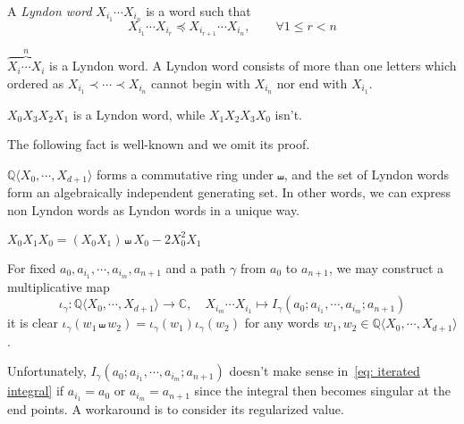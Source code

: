 \begin{definition}
A \textit{Lyndon word} $X_{i_1}\cdots X_{i_n}$ is a word such that
\begin{equation}\label{eq: Lyndon word}
X_{i_1}\cdots X_{i_r}\preceq X_{i_{r+1}}\cdots X_{i_n},\qquad\forall 1\leq r<n
\end{equation}
\end{definition}

\begin{remark}
$\overbrace{X_i\cdots X_i}^{n}$ is a Lyndon word. A Lyndon word consists of more than one letters which ordered as $X_{i_1}\prec\cdots\prec X_{i_n}$ cannot begin with $X_{i_n}$ nor end with $X_{i_1}$.
\end{remark}

\begin{example}
$X_0X_3X_2X_1$ is a Lyndon word, while $X_1X_2X_3X_0$ isn't.
\end{example}

The following fact is well-known and we omit its proof.

\begin{theorem}\cite{Radford_ANaturalRingBasisForTheShuffleAlgebraAndAnApplicationToGroupSchemes}\label{thm:Lyndon words}
$\mathbb Q\langle X_0,\cdots,X_{d+1}\rangle$ forms a commutative ring under $\shuffle$, and the set of Lyndon words form an algebraically independent generating set. In other words, we can express non Lyndon words as Lyndon words in a unique way.
\end{theorem}

\begin{example}\label{ex: Lyndon thm example}
$X_0X_1X_0=(X_0X_1)\shuffle X_0-2X_0^2X_1$
\end{example}

For fixed $a_0,a_{i_1},\cdots,a_{i_m},a_{n+1}$ and a path $\gamma$ from $a_0$ to $a_{n+1}$, we may construct a multiplicative map
\[
\iota_\gamma:\mathbb Q\langle X_0,\cdots,X_{d+1}\rangle\to\mathbb C,\quad X_{i_m}\cdots X_{i_1}\mapsto I_\gamma(a_0;a_{i_1},\cdots,a_{i_m};a_{n+1})
\]
it is clear $\iota_\gamma(w_1\shuffle w_2)=\iota_\gamma(w_1)\iota_\gamma(w_2)$ for any words $w_1,w_2\in\mathbb Q\langle X_0,\cdots,X_{d+1}\rangle$.

Unfortunately, $I_\gamma(a_0;a_{i_1},\cdots,a_{i_m};a_{n+1})$ doesn't make sense in~\eqref{eq: iterated integral} if $a_{i_1}=a_0$ or $a_{i_m}=a_{n+1}$ since the integral then becomes singular at the end points. A workaround is to consider its regularized value.

